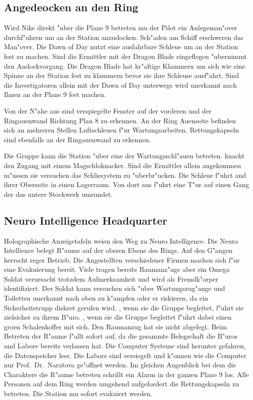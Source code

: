 \subsection{Angedeocken an den Ring}
Wird Nike direkt "uber die Plane 9 betreten mu\3 der Pilot ein Anlegeman"over durchf"uhren um an der Station anzudocken. Sch"aden am Schiff erschweren das Man"over. Die Dawn of Day nutzt eine ausfahrbare Schleu\3e um an der Station fest zu machen. Sind die Ermittler mit der Dragon Blade eingeflogen "ubernimmt \xl{} den Andockvorgang. Die Dragon Blade hat kr"aftige Klammern um sich wie eine Spinne an der Station fest zu klammern bevor sie ihre Schleuse ausf"ahrt. Sind die Investigatoren allein mit der Dawn of Day unterwegs wird \xl{} unerkannt nach Ihnen an der Plane 9 fest machen.

Von der N"ahe aus sind verspiegelte Fenster auf der vorderen und der Ringau\3enwand Richtung Plan 8 zu erkennen. An der Ring Au\3enseite befinden sich an mehreren Stellen Luftschleu\3en f"ur Wartungsarbeiten. Rettungskapseln sind ebenfalls an der Ringau\3enwand zu erkennen.

Die Gruppe kann die Station "uber eine der Wartungsschl"au\3en betreten. \xl{} knackt den Zugang mit einem Magschlo\3knacker. Sind die Ermittler allein angekommen m"ussen sie versuchen das Schlie\3system zu "uberbr"ucken. Die Schleu\3e f"uhrt and ihrer Oberseite in einen Lagerraum. Von dort aus f"uhrt eine T"ur auf einen Gang der das untere Stockwerk umrundet. 

\subsection{Neuro Intelligence Headquarter}
Holographische Anzeigetafeln wei\3en den Weg zu Neuro Intelligence. Die Neuro Intellience belegt R"aume auf der oberen Ebene des Rings. Auf den G"angen herrscht reger Betrieb. Die Angestellten verschiedener Firmen machen sich f"ur eine Evakuierung bereit. Viele tragen bereits Raumanz"uge aber ein Omega Soldat verursacht trotzdem Aufmerksamkeit und wird als Fremdk"orper identifiziert. Der Soldat kann versuchen sich "uber Wartungszug"ange und Toiletten unerkannt nach oben zu k"ampfen oder er riskieren, da\3 ein Sicherheitstrupp diskret gerufen wird. \ml{}, wenn sie die Gruppe begleitet, f"uhrt sie zielsicher zu ihrem B"uro. \xl{}, wenn sie die Gruppe begleitet f"uhrt dabei einen gro\3en Schalenkoffer mit sich. Den Raumanzug hat sie nicht abgelegt. Beim Betreten der R"aume f"allt sofort auf, da\3 die gesammte Belegschaft die B"uros und Labore bereits verlassen hat. Die Computer Systeme sind herunter gefahren, die Datenspeicher leer. Die Labore sind versiegelt und k"onnen wie die Computer nur Prof.~Dr.~Naratova ge"offnet werden. Im gleichen Augenblick bei dem die Charaktere die R"aume betreten schrillt ein Alarm in der ganzen Plane 9 los. Alle Personen auf dem Ring werden umgehend aufgefordert die Rettungskapseln zu betreten. Die Station mu\3 sofort evakuiert werden. 

